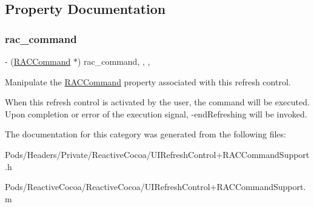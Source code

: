 \subsection{Property Documentation}
\mbox{\label{category_u_i_refresh_control_07_r_a_c_command_support_08_a5745242acbc3bf93a1cebc652b37c9c3}} 
\subsubsection{\texorpdfstring{rac\+\_\+command}{rac\_command}}
{\footnotesize\ttfamily -\/ (\mbox{\hyperlink{interface_r_a_c_command}{R\+A\+C\+Command}} $\ast$) rac\+\_\+command\hspace{0.3cm}{\ttfamily [read]}, {\ttfamily [write]}, {\ttfamily [nonatomic]}, {\ttfamily [strong]}}

Manipulate the \mbox{\hyperlink{interface_r_a_c_command}{R\+A\+C\+Command}} property associated with this refresh control.

When this refresh control is activated by the user, the command will be executed. Upon completion or error of the execution signal, -\/end\+Refreshing will be invoked. 

The documentation for this category was generated from the following files\+:\begin{DoxyCompactItemize}
\item 
Pods/\+Headers/\+Private/\+Reactive\+Cocoa/U\+I\+Refresh\+Control+\+R\+A\+C\+Command\+Support.\+h\item 
Pods/\+Reactive\+Cocoa/\+Reactive\+Cocoa/U\+I\+Refresh\+Control+\+R\+A\+C\+Command\+Support.\+m\end{DoxyCompactItemize}
